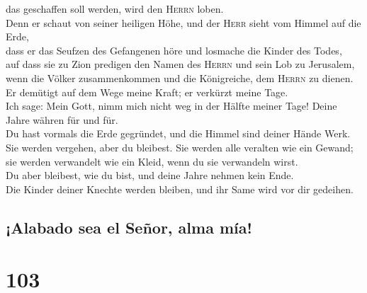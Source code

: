 das geschaffen soll werden, wird den \textsc{Herrn} loben.\\
 Denn er schaut von seiner heiligen Höhe, und der
\textsc{Herr} sieht vom Himmel auf die Erde,\\
 dass er das Seufzen des Gefangenen höre und losmache die
Kinder des Todes,\\
 auf dass sie zu Zion predigen den Namen des
\textsc{Herrn} und sein Lob zu Jerusalem,\\
 wenn die Völker zusammenkommen und die Königreiche, dem
\textsc{Herrn} zu dienen.\\
 Er demütigt auf dem Wege meine Kraft; er verkürzt meine
Tage.\\
 Ich sage: Mein Gott, nimm mich nicht weg in der Hälfte
meiner Tage! Deine Jahre währen für und für.\\
 Du hast vormals die Erde gegründet, und die Himmel sind
deiner Hände Werk.\\
 Sie werden vergehen, aber du bleibest. Sie werden alle
veralten wie ein Gewand; sie werden verwandelt wie ein Kleid, wenn du
sie verwandeln wirst.\\
 Du aber bleibest, wie du bist, und deine Jahre nehmen
kein Ende.\\
 Die Kinder deiner Knechte werden bleiben, und ihr Same
wird vor dir gedeihen.

\hypertarget{alabado-sea-el-seuxf1or-alma-muxeda}{%
\subsection{¡Alabado sea el Señor, alma
mía!}\label{alabado-sea-el-seuxf1or-alma-muxeda}}

\hypertarget{section-102}{%
\section{103}\label{section-102}}

